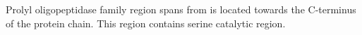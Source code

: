 Prolyl oligopeptidase family region spans from is located towards the C-terminus of the protein chain. This region contains serine catalytic region.  